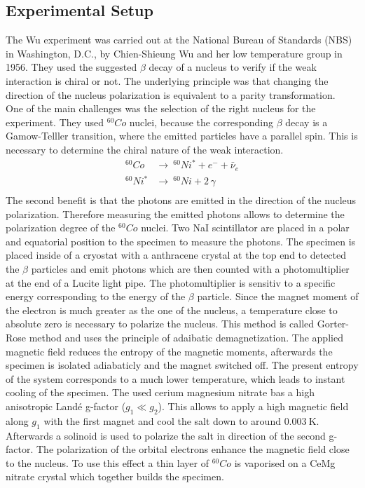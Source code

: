 \subsection{Experimental Setup}
The Wu experiment was carried out at the National Bureau of Standards (NBS) in Washington, D.C., by Chien-Shieung Wu and her low temperature group in 1956.
They used the suggested $\beta$ decay of a nucleus to verify if the weak interaction is chiral or not. The underlying principle was that changing the direction of the nucleus polarization is equivalent to a parity transformation. \\
One of the main challenges was the selection of the right nucleus for the experiment. They used $^{60}Co$ nuclei, because the corresponding $\beta$ decay is a Gamow-Telller transition, where the emitted particles have a parallel spin. This is necessary to determine the chiral nature of the weak interaction.
\begin{align*}
  ^{60}Co &\rightarrow \ ^{60}Ni^{*} + e^- + \bar{\nu}_e \label{eqn:kobalt-zerfall}\\
  ^{60}Ni^{*} & \rightarrow \ ^{60}Ni + 2 \, \gamma \\
\end{align*}
The second benefit is that the photons are emitted in the direction of the nucleus polarization. Therefore measuring the emitted photons allows to determine the polarization degree of the $^{60}Co$ nuclei. Two NaI scintillator are placed in a polar and equatorial position to the specimen to measure the photons. The specimen is placed inside of a cryostat with a anthracene crystal at the top end to detected the $\beta$ particles and emit photons which are then counted with a photomultiplier at the end of a Lucite light pipe. The photomultiplier is sensitiv to a specific energy corresponding to the energy of the $\beta$ particle.
Since the magnet moment of the electron is much greater as the one of the nucleus, a temperature close to absolute zero is necessary to polarize the nucleus. This method is called Gorter-Rose method and uses the principle of adaibatic demagnetization. The applied magnetic field reduces the entropy of the magnetic moments, afterwards the specimen is isolated adiabaticly and the magnet switched off. The present entropy of the system corresponds to a much lower temperature, which leads to instant cooling of the specimen. The used cerium magnesium nitrate bas a high anisotropic Landé g-factor ($g_1 \ll g_2$). This allows to apply a high magnetic field along $g_1$ with the first magnet and cool the salt down to around $\SI{0.003}{\kelvin}$. Afterwards a solinoid is used to polarize the salt in direction of the second g-factor. The polarization of the orbital electrons enhance the magnetic field close to the nucleus. To use this effect a thin layer of $^{60}Co$ is vaporised on a CeMg nitrate crystal which together builds the specimen.
